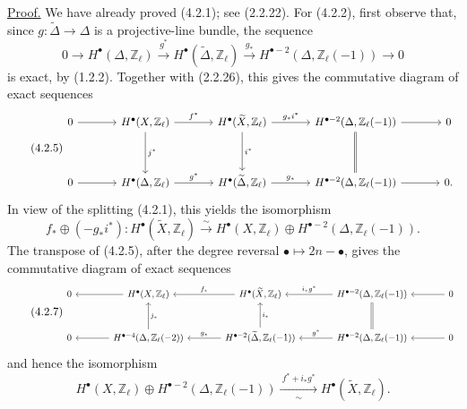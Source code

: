 \underline{Proof.}
We have already proved (4.2.1); see (2.2.22).  For (4.2.2), first observe
that, since $g:\widetilde\Delta\to\Delta$ is a projective-line bundle, the
sequence
\begin{equation}\tag{4.2.4}
0\longrightarrow H^\bullet(\Delta,\mathbb Z_\ell)
\xrightarrow{g^*}H^\bullet(\widetilde\Delta,\mathbb Z_\ell)
\xrightarrow{g_*}H^{\bullet-2}(\Delta,\mathbb Z_\ell(-1))
\longrightarrow0
\end{equation}
is exact, by (1.2.2).  Together with (2.2.26), this gives the commutative
diagram of exact sequences
\begin{equation}\tag{4.2.5}
\resizebox{\textwidth}{!}{%
\begin{tikzcd}[ampersand replacement=\&,column sep=large,row sep=huge]
0\arrow[r]
  \&H^\bullet(X,\mathbb Z_\ell)
       \arrow[r,"f^*"]\arrow[d,"j^*" right]
  \&H^\bullet(\widetilde X,\mathbb Z_\ell)
       \arrow[r,"g_*i^*"]\arrow[d,"i^*" right]
  \&H^{\bullet-2}(\Delta,\mathbb Z_\ell(-1))
       \arrow[r]\arrow[d,equal]
  \&0\\
0\arrow[r]
  \&H^\bullet(\Delta,\mathbb Z_\ell)
       \arrow[r,"g^*"]
  \&H^\bullet(\widetilde\Delta,\mathbb Z_\ell)
       \arrow[r,"g_*"]
  \&H^{\bullet-2}(\Delta,\mathbb Z_\ell(-1))
       \arrow[r]
  \&0.
\end{tikzcd}}
\end{equation}
In view of the splitting (4.2.1), this yields the isomorphism
\begin{equation}\tag{4.2.6}
f_*\oplus(-g_*i^*):
H^\bullet(\widetilde X,\mathbb Z_\ell)
\xrightarrow{\sim}
H^\bullet(X,\mathbb Z_\ell)\oplus
H^{\bullet-2}(\Delta,\mathbb Z_\ell(-1)).
\end{equation}
The transpose of (4.2.5), after the degree reversal
$\bullet\mapsto2n-\bullet$, gives the commutative diagram of exact sequences
\begin{equation}\tag{4.2.7}
\resizebox{\textwidth}{!}{%
\begin{tikzcd}[ampersand replacement=\&,column sep=large,row sep=large]
0
  \&H^\bullet(X,\mathbb Z_\ell)\arrow[l]
  \&H^\bullet(\widetilde X,\mathbb Z_\ell)\arrow[l,"f_*"']
  \&H^{\bullet-2}(\Delta,\mathbb Z_\ell(-1))
       \arrow[l,"i_*g^*"']
  \&0\arrow[l]\\
0
  \&H^{\bullet-4}(\Delta,\mathbb Z_\ell(-2))
       \arrow[l]\arrow[u,"j_*"']
  \&H^{\bullet-2}(\widetilde\Delta,\mathbb Z_\ell(-1))
       \arrow[l,"g_*"']\arrow[u,"i_*"']
  \&H^{\bullet-2}(\Delta,\mathbb Z_\ell(-1))
       \arrow[l,"g^*"']\arrow[u,equal]
  \&0\arrow[l]
\end{tikzcd}}
\end{equation}
and hence the isomorphism
\begin{equation}\tag{4.2.8}
H^\bullet(X,\mathbb Z_\ell)\oplus
H^{\bullet-2}(\Delta,\mathbb Z_\ell(-1))
\xrightarrow[\sim]{\ f^*+i_*g^*\ }
H^\bullet(\widetilde X,\mathbb Z_\ell).
\end{equation}
